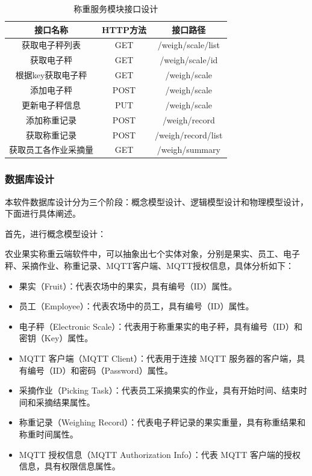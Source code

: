 \documentclass{xduugmr}
\begin{document}
\begin{table}[H]
\centering
\begin{tabular}{|c|c|c|}
\hline
\textbf{接口名称} & \textbf{HTTP方法} & \textbf{接口路径} \\
\hline
获取电子秤列表 & GET & /weigh/scale/list \\
\hline
获取电子秤 & GET & /weigh/scale/{id} \\
\hline
根据key获取电子秤 & GET & /weigh/scale \\
\hline
添加电子秤 & POST & /weigh/scale \\
\hline
更新电子秤信息 & PUT & /weigh/scale \\
\hline
添加称重记录 & POST & /weigh/record \\
\hline
获取称重记录 & POST & /weigh/record/list \\
\hline
获取员工各作业采摘量 & GET & /weigh/summary \\
\hline
\end{tabular}%

\caption{称重服务模块接口设计}
\label{tab:称重服务模块接口设计}
\end{table}

\subsubsection{数据库设计}

本软件数据库设计分为三个阶段：概念模型设计、逻辑模型设计和物理模型设计，下面进行具体阐述。

首先，进行概念模型设计：

农业果实称重云端软件中，可以抽象出七个实体对象，分别是果实、员工、电子秤、采摘作业、称重记录、MQTT客户端、MQTT授权信息，具体分析如下：

\begin{itemize}
    \item 果实（Fruit）：代表农场中的果实，具有编号（ID）属性。
    \item 员工（Employee）：代表农场中的员工，具有编号（ID）属性。
    \item 电子秤（Electronic Scale）：代表用于称重果实的电子秤，具有编号（ID）和密钥（Key）属性。
    \item MQTT 客户端（MQTT Client）：代表用于连接 MQTT 服务器的客户端，具有编号（ID）和密码（Password）属性。
    \item 采摘作业（Picking Task）：代表员工采摘果实的作业，具有开始时间、结束时间和采摘结果属性。
    \item 称重记录（Weighing Record）：代表电子秤记录的果实重量，具有称重结果和称重时间属性。
    \item MQTT 授权信息（MQTT Authorization Info）：代表 MQTT 客户端的授权信息，具有权限信息属性。
\end{itemize}
\end{document}
